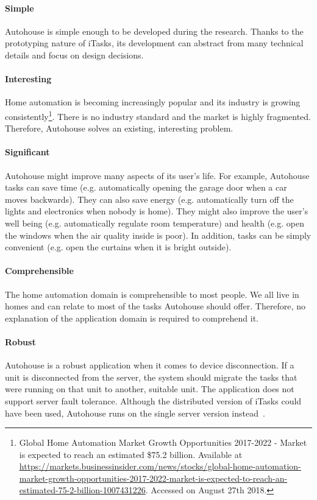 \paragraph{Simple} Autohouse is  simple enough to be developed during the research. Thanks to the prototyping nature of \gls{iTasks}, its development can abstract from many technical details and focus on design decisions.

\paragraph{Interesting} Home automation is becoming increasingly popular and its industry is growing consistently\footnote{Global Home Automation Market Growth Opportunities 2017-2022 - Market is expected to reach an estimated \$75.2 billion. Available at \url{https://markets.businessinsider.com/news/stocks/global-home-automation-market-growth-opportunities-2017-2022-market-is-expected-to-reach-an-estimated-75-2-billion-1007431226}. Accessed on August 27th 2018.}. There is no industry standard and the market is highly fragmented. Therefore, Autohouse solves an existing, interesting problem.

\paragraph{Significant} Autohouse might improve many aspects of its user's life. For example, Autohouse tasks can save time (e.g. automatically opening the garage door when a car moves backwards). They can also save energy (e.g. automatically turn off the lights and electronics when nobody is home). They might also improve the user's well being (e.g. automatically regulate room temperature) and health (e.g. open the windows when the air quality inside is poor). In addition, tasks can be simply convenient (e.g. open the curtains when it is bright outside).

\paragraph{Comprehensible} The home automation domain is comprehensible to most people. We all live in homes and can relate to most of the tasks Autohouse should offer. Therefore, no explanation of the application domain is required to comprehend it. 

\paragraph{Robust} Autohouse is a robust application when it comes to device disconnection. If a unit is disconnected from the server, the system should migrate the tasks that were running on that unit to another, suitable unit. The application does not support server fault tolerance. Although the distributed version of \gls{iTasks} could have been used, Autohouse runs on the single server version instead~\cite{distributed}.

